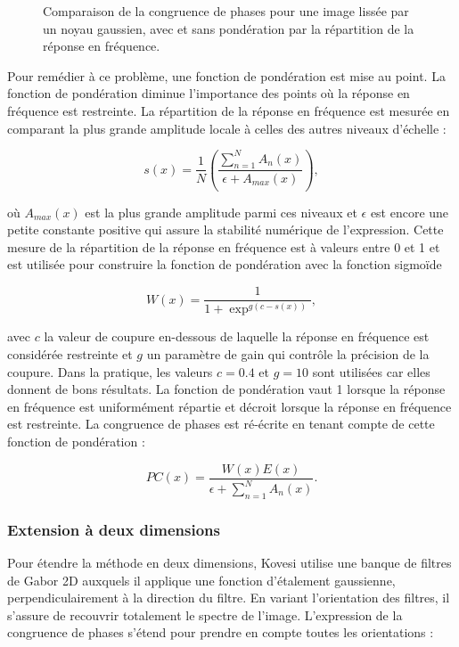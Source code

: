 \begin{figure}
    \caption[Congruence de phases pour une image lissée par noyau gaussien]{Comparaison de la congruence de phases pour une image lissée par un noyau gaussien, avec et sans pondération par la répartition de la réponse en fréquence.}
    \label{fig:phase-congruency-spread}
\end{figure}

Pour remédier à ce problème, une fonction de pondération est mise au point. La fonction de pondération diminue l'importance des points où la réponse en fréquence est restreinte. La répartition de la réponse en fréquence est mesurée en comparant la plus grande amplitude locale à celles des autres niveaux d'échelle :

\begin{equation}
    s(x) = \frac1N\left(\frac{\sum_{n=1}^{N}A_n(x)}{\epsilon + A_{max}(x)}\right),
\end{equation}

\noindent où $A_{max}(x)$ est la plus grande amplitude parmi ces niveaux et $\epsilon$ est encore une petite constante positive qui assure la stabilité numérique de l'expression. Cette mesure de la répartition de la réponse en fréquence est à valeurs entre 0 et 1 et est utilisée pour construire la fonction de pondération avec la fonction sigmoïde

\begin{equation}
    W(x) = \frac{1}{1 + \exp^{g(c-s(x))}},
\end{equation}

\noindent avec $c$ la valeur de coupure en-dessous de laquelle la réponse en fréquence est considérée restreinte et $g$ un paramètre de gain qui contrôle la précision de la coupure. Dans la pratique, les valeurs $c = 0.4$ et $g = 10$ sont utilisées car elles donnent de bons résultats. La fonction de pondération vaut 1 lorsque la réponse en fréquence est uniformément répartie et décroit lorsque la réponse en fréquence est restreinte. La congruence de phases est ré-écrite en tenant compte de cette fonction de pondération :

\begin{equation}
    PC(x) = \frac{W(x)E(x)}{\epsilon + \sum_{n=1}^{N} A_n(x)}.
\end{equation}

\subsubsection{Extension à deux dimensions}

Pour étendre la méthode en deux dimensions, Kovesi utilise une banque de filtres de Gabor 2D auxquels il applique une fonction d'étalement gaussienne, perpendiculairement à la direction du filtre. En variant l'orientation des filtres, il s'assure de recouvrir totalement le spectre de l'image. L'expression de la congruence de phases s'étend pour prendre en compte toutes les orientations :

